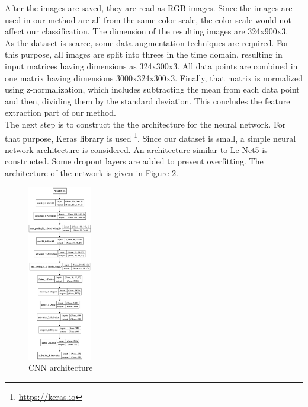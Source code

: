 \documentclass[acmtog, authorversion]{acmart}
\begin{document}
After the images are saved, they are read as RGB images. Since the images are used in our method are all from the same color scale, 
the color scale would not affect our classification. The dimension of the resulting images are 324x900x3. \\
As the dataset is scarce, some data augmentation techniques are required. For this purpose, all images are split into threes in the time domain, resulting in 
input matrices having dimensions as 324x300x3. All data points are combined in one matrix having dimensions 3000x324x300x3. Finally, that matrix is normalized
using z-normalization, which includes subtracting the mean from each data point and then, dividing them by the standard deviation. This concludes the feature
extraction part of our method.\\
The next step is to construct the the architecture for the neural network. For that purpose, Keras library is used \footnote{\url{https://keras.io}}. Since
our dataset is small, a simple neural network architecture is considered. An architecture similar to Le-Net5 \cite{lecun2015lenet} is constructed.
 Some dropout layers are added to prevent overfitting. The architecture of the network is given in Figure 2. \\
\begin{figure}[h!]
  \centering
  \includegraphics[width=0.25\textwidth]{model}
  \caption{CNN architecture}
  \end{figure}
\end{document}
